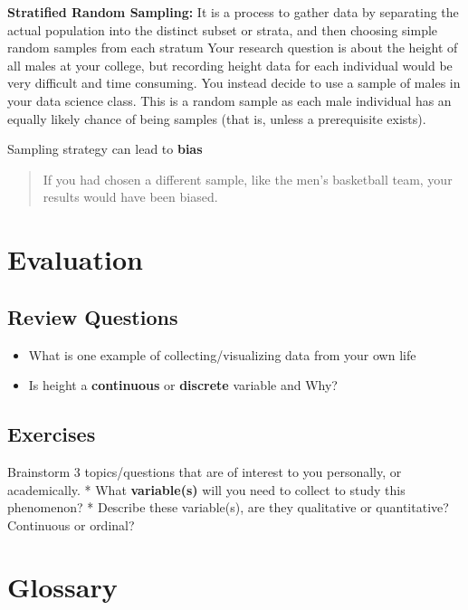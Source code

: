 \documentclass[
]{book}
\providecommand{\tightlist}{%
  \setlength{\itemsep}{0pt}\setlength{\parskip}{0pt}}
\begin{document}
\textbf{Stratified Random Sampling:} It is a process to gather data by
separating the actual population into the distinct subset or
strata, and then choosing simple random samples from each stratum
Your research question is about the height of all males at your
college, but recording height data for each individual would be
very difficult and time consuming. You instead decide to use a
sample of males in your data science class. This is a random
sample as each male individual has an equally likely chance of
being samples (that is, unless a prerequisite exists).

Sampling strategy can lead to \textbf{bias}

\begin{quote}
If you had chosen a different sample, like the men's basketball
team, your results would have been biased.
\end{quote}

\hypertarget{evaluation}{%
\section*{Evaluation}\label{evaluation}}

\hypertarget{review-questions}{%
\subsection{Review Questions}\label{review-questions}}

\begin{itemize}
\tightlist
\item
  What is one example of collecting/visualizing data from your own life
\item
  Is height a \textbf{continuous} or \textbf{discrete} variable and Why?
\end{itemize}

\hypertarget{exercises}{%
\subsection{Exercises}\label{exercises}}

Brainstorm 3 topics/questions that are of interest to you personally, or academically.
* What \textbf{variable(s)} will you need to collect to study this phenomenon?
* Describe these variable(s), are they qualitative or quantitative? Continuous or ordinal?

\hypertarget{glossary-1}{%
\section*{Glossary}\label{glossary-1}}
\end{document}
